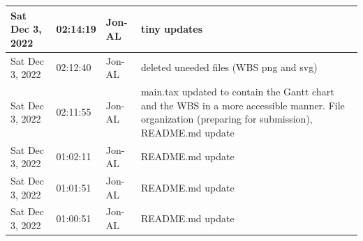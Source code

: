 \documentclass[11pt]{article}
\begin{document}
\begin{center}
\begin{longtable}{|p{2.7cm}|l|p{2cm}|p{8cm}|}
            Sat Dec 3, 2022                            & 02:14:19                           & Jon-AL                                  & tiny updates                                                                                                                                                                                                                                                                                               \\
           \hline Sat Dec 3, 2022                            & 02:12:40                           & Jon-AL                                  & deleted uneeded files (WBS png and svg)                                                                                                                                                                                                                                                                    \\
           \hline Sat Dec 3, 2022                            & 02:11:55                           & Jon-AL                                  & main.tax updated to contain the Gantt chart and the WBS in a more accessible manner. File organization (preparing for submission), README.md update                                                                                                                                                        \\
           \hline Sat Dec 3, 2022                            & 01:02:11                           & Jon-AL                                  & README.md update                                                                                                                                                                                                                                                                                           \\
           \hline Sat Dec 3, 2022                            & 01:01:51                           & Jon-AL                                  & README.md update                                                                                                                                                                                                                                                                                           \\
           \hline Sat Dec 3, 2022                            & 01:00:51                           & Jon-AL                                  & README.md update                                                                                                                                                                                                                                                                                           \\

\end{longtable}
\end{center}
\end{document}
